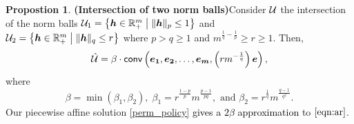 \documentclass[11pt]{article}
\theoremstyle{plain}
\theoremstyle{definition}
\newtheorem{prop}[theorem]{Propostion}
\numberwithin{equation}{section}%
\numberwithin{equation}{section}%
\newcommand{\mb}[1]{\ensuremath{\boldsymbol{#1}}}
\newcommand*{\red}{\textcolor{black}}
\begin{document}
\begin{prop} {\bf{(Intersection of two norm balls)}}\label{prop:twoball} Consider $ {\cal U}$ the intersection of the norm balls  $ {\cal U}_1= \left\{ \mb h \in \mathbb R^{m}_+ \;  \big\vert \; \| \mb h\| _p \leq 1 \right\}$  and \\ $ {\cal U}_2= \left\{ \mb h \in \mathbb R^{m}_+ \;  \big\vert \; \| \mb h\| _q \leq r \right\}$ where $ p > q \geq 1 $ and $m^{\frac{1}{q}-\frac{1}{p}} \geq r \geq 1$. Then,
 $$ \hat{ \cal U} = \beta \cdot {\sf{conv}} \left( \mb{e_1}, \mb{e_2},\ldots, \mb{e_m}, \left( r m^{-\frac{1}{q}}\right) \mb e \right),$$
 where
 \[ \beta = \min( \beta_1, \beta_2), \; \beta_1= r^{\frac{1-p}{p}}m^{\frac{p-1}{pq}}, \mbox{ and } \beta_2=r^{\frac{1}{q}}m^{\frac{q-1}{q^2}}.\]
 Our piecewise affine solution \eqref{perm_policy} \red{gives a $2 \beta$ approximation }to $\eqref{eqn:ar}$.
\end{prop}
\end{document}
